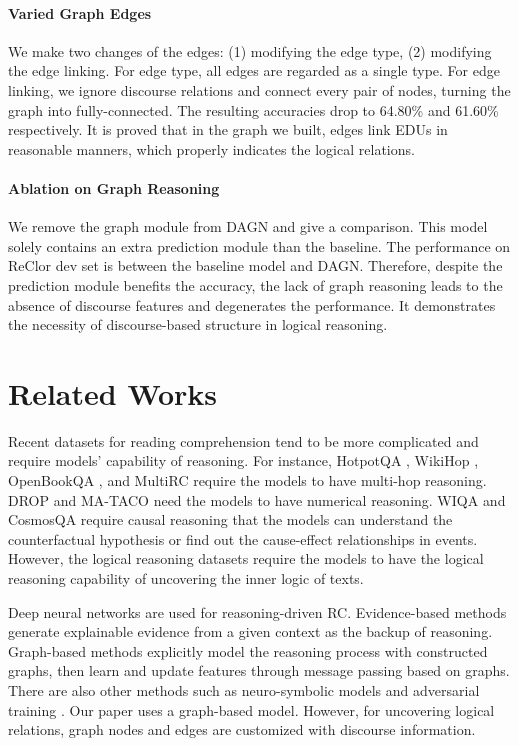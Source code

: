 \documentclass[11pt]{article}
\newcommand{\moe}[1]{{\color{black} #1}}
\begin{document}
\paragraph{Varied Graph Edges} 
We make two changes of the edges: (1) modifying the edge type, (2) modifying the edge linking. 
For edge type, all edges are regarded as a single type.
For edge linking, we ignore discourse relations and connect every pair of nodes, turning the graph into fully-connected.
The resulting accuracies drop to 64.80\% and 61.60\% respectively.
It is proved that in the graph we built, edges link EDUs in reasonable manners, which properly indicates the logical relations.


\paragraph{Ablation on Graph Reasoning}
\moe{We remove the graph module from DAGN and give a comparison.}
This model solely contains an extra prediction module than the baseline. The performance on ReClor dev set is between the baseline model and DAGN. Therefore, despite the prediction module benefits the accuracy, the lack of graph reasoning leads to the absence of discourse features and degenerates the performance. It demonstrates the necessity of discourse-based structure in logical reasoning.


\section{Related Works}
\vspace{-1mm}
Recent datasets for reading comprehension tend to be more complicated and require models' capability of reasoning. For instance, HotpotQA \cite{yang2018hotpotqa}, WikiHop \cite{welbl2018constructing}, OpenBookQA \cite{mihaylov2018can}, and MultiRC \cite{khashabi2018looking} require the models to have multi-hop reasoning.
DROP \cite{dua2019drop} and MA-TACO \cite{zhou-etal-2019-going} need the models to have numerical reasoning.
WIQA \cite{tandon2019wiqa} and CosmosQA \cite{huang2019cosmos} require causal reasoning that the 
models can understand the counterfactual hypothesis or find out the cause-effect relationships in events. 
However, the logical reasoning datasets \cite{yu2020reclor, liu2020logiqa} require the models to have the logical reasoning capability of uncovering the inner logic of texts. 



Deep neural networks are used for reasoning-driven RC.
Evidence-based methods \cite{madaan2020eigen, huang2020rem, rajagopal2020if} generate explainable evidence from a given context as the backup of reasoning. Graph-based methods \cite{qiu-etal-2019-dynamically,de2019question,cao2019bag, ran2019numnet, chen-etal-2020-question,yunqiu2020deep, zhang2020graph} explicitly model the reasoning process with constructed graphs, then learn and update features through message passing based on graphs. There are also other methods such as neuro-symbolic models \cite{saha2021weakly} and adversarial training \cite{pereira-etal-2020-adversarial}. 
Our paper uses a graph-based model. However, for uncovering logical relations, graph nodes and edges are customized with discourse information. 
\end{document}
